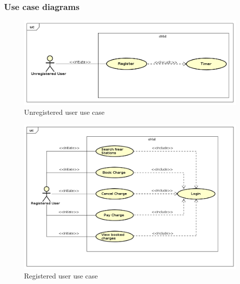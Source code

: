 \begin{enumerate}[label=\textbf{R\arabic*}]
\end{enumerate}


\clearpage
\subsubsection{Use case diagrams}
\begin{figure}[!h]
    \includegraphics[keepaspectratio, width=16cm]{UseCase/UnregisteredUser.png}
    \caption{Unregistered user use case}
\end{figure}
\begin{figure}[!h]
    \includegraphics[keepaspectratio, width=16cm]{UseCase/RegisteredUser.png}
    \caption{Registered user use case}
\end{figure}
